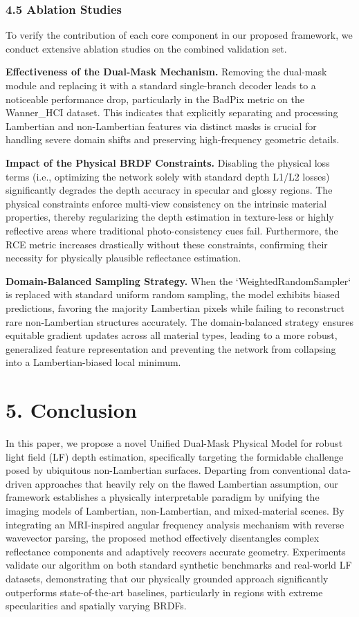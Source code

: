 \documentclass[journal]{IEEEtran}
\begin{document}
\subsubsection{4.5 Ablation Studies}

To verify the contribution of each core component in our proposed framework, we conduct extensive ablation studies on the combined validation set. 

\textbf{Effectiveness of the Dual-Mask Mechanism.} 
Removing the dual-mask module and replacing it with a standard single-branch decoder leads to a noticeable performance drop, particularly in the BadPix metric on the Wanner_HCI dataset. This indicates that explicitly separating and processing Lambertian and non-Lambertian features via distinct masks is crucial for handling severe domain shifts and preserving high-frequency geometric details.

\textbf{Impact of the Physical BRDF Constraints.} 
Disabling the physical loss terms (i.e., optimizing the network solely with standard depth L1/L2 losses) significantly degrades the depth accuracy in specular and glossy regions. The physical constraints enforce multi-view consistency on the intrinsic material properties, thereby regularizing the depth estimation in texture-less or highly reflective areas where traditional photo-consistency cues fail. Furthermore, the RCE metric increases drastically without these constraints, confirming their necessity for physically plausible reflectance estimation.

\textbf{Domain-Balanced Sampling Strategy.} 
When the `WeightedRandomSampler` is replaced with standard uniform random sampling, the model exhibits biased predictions, favoring the majority Lambertian pixels while failing to reconstruct rare non-Lambertian structures accurately. The domain-balanced strategy ensures equitable gradient updates across all material types, leading to a more robust, generalized feature representation and preventing the network from collapsing into a Lambertian-biased local minimum.

\section{5. Conclusion}


In this paper, we propose a novel Unified Dual-Mask Physical Model for robust light field (LF) depth estimation, specifically targeting the formidable challenge posed by ubiquitous non-Lambertian surfaces. Departing from conventional data-driven approaches that heavily rely on the flawed Lambertian assumption, our framework establishes a physically interpretable paradigm by unifying the imaging models of Lambertian, non-Lambertian, and mixed-material scenes. By integrating an MRI-inspired angular frequency analysis mechanism with reverse wavevector parsing, the proposed method effectively disentangles complex reflectance components and adaptively recovers accurate geometry. Experiments validate our algorithm on both standard synthetic benchmarks and real-world LF datasets, demonstrating that our physically grounded approach significantly outperforms state-of-the-art baselines, particularly in regions with extreme specularities and spatially varying BRDFs.
\end{document}

